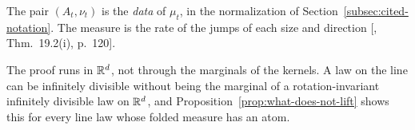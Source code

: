 The pair $(A_t, \nu_t)$ is the \emph{\Levy{} data} of $\mu_t$, in the normalization of
Section~\ref{subsec:cited-notation}. The \Levy{} measure is the rate of the jumps of each size and
direction [, Thm.~19.2(i), p.~120].

The proof runs in $\mathbb{R}^d$, not through the marginals of the kernels. A law on the line can be
infinitely divisible without being the marginal of a rotation-invariant infinitely divisible law on
$\mathbb{R}^d$, and Proposition~\ref{prop:what-does-not-lift} shows this for every line law whose folded
\Levy{} measure has an atom.

